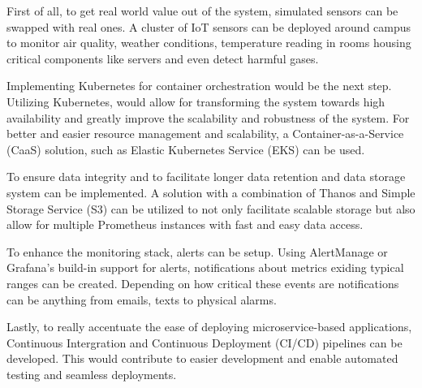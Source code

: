 First of all, to get real world value out of the system, simulated sensors can be swapped with real ones. A cluster of IoT sensors can be deployed around campus to monitor air quality, weather conditions, temperature reading in rooms housing critical components like servers and even detect harmful gases. 

Implementing Kubernetes for container orchestration would be the next step. Utilizing Kubernetes, would allow for transforming the system towards high availability and greatly improve the scalability and robustness of the system. For better and easier resource management and scalability, a Container-as-a-Service (CaaS) solution, such as Elastic Kubernetes Service (EKS) can be used.

To ensure data integrity and to facilitate longer data retention and data storage system can be implemented. A solution with a combination of Thanos and Simple Storage Service (S3) can be utilized to not only facilitate scalable storage but also allow for multiple Prometheus instances with fast and easy data access.

To enhance the monitoring stack, alerts can be setup. Using AlertManage or Grafana's build-in support for alerts, notifications about metrics exiding typical ranges can be created. Depending on how critical these events are notifications can be anything from emails, texts to physical alarms.

Lastly, to really accentuate the ease of deploying microservice-based applications, Continuous Intergration and Continuous Deployment (CI/CD) pipelines can be developed. This would contribute to easier development and enable automated testing and seamless deployments.
